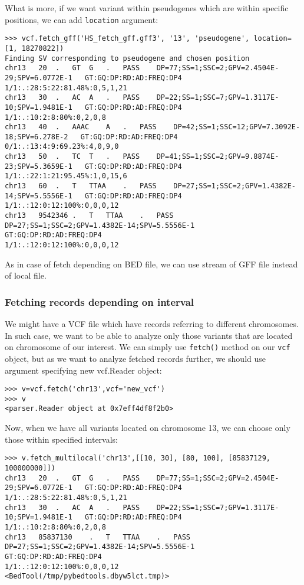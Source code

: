 \noindent What is more, if we want variant within pseudogenes which are within specific positions, we can add
\verb|location| argument:


\begin{verbatim}
>>> vcf.fetch_gff('HS_fetch_gff.gff3', '13', 'pseudogene', location=[1, 18270822])
Finding SV corresponding to pseudogene and chosen position
chr13	20	.	GT	G	.	PASS	DP=77;SS=1;SSC=2;GPV=2.4504E-29;SPV=6.0772E-1	GT:GQ:DP:RD:AD:FREQ:DP4
1/1:.:28:5:22:81.48%:0,5,1,21
chr13	30	.	AC	A	.	PASS	DP=22;SS=1;SSC=7;GPV=1.3117E-10;SPV=1.9481E-1	GT:GQ:DP:RD:AD:FREQ:DP4
1/1:.:10:2:8:80%:0,2,0,8
chr13	40	.	AAAC	A	.	PASS	DP=42;SS=1;SSC=12;GPV=7.3092E-18;SPV=6.278E-2	GT:GQ:DP:RD:AD:FREQ:DP4
0/1:.:13:4:9:69.23%:4,0,9,0
chr13	50	.	TC	T	.	PASS	DP=41;SS=1;SSC=2;GPV=9.8874E-23;SPV=5.3659E-1	GT:GQ:DP:RD:AD:FREQ:DP4
1/1:.:22:1:21:95.45%:1,0,15,6
chr13	60	.	T	TTAA	.	PASS	DP=27;SS=1;SSC=2;GPV=1.4382E-14;SPV=5.5556E-1	GT:GQ:DP:RD:AD:FREQ:DP4
1/1:.:12:0:12:100%:0,0,0,12
chr13	9542346	.	T	TTAA	.	PASS	DP=27;SS=1;SSC=2;GPV=1.4382E-14;SPV=5.5556E-1	GT:GQ:DP:RD:AD:FREQ:DP4
1/1:.:12:0:12:100%:0,0,0,12
\end{verbatim}


\noindent As in case of fetch depending on BED file, we can use stream of GFF file instead of local file.


\subsubsection{Fetching records depending on interval}


\noindent We might have a VCF file which have records referring to different chromosomes. In such case, we want to be able to
analyze only those variants that are located on chromosome of our interest. We can simply use \verb|fetch()| method
on our \verb|vcf| object, but as we want to analyze fetched records further, we should use argument specifying
new vcf.Reader object:


\begin{verbatim}
>>> v=vcf.fetch('chr13',vcf='new_vcf')
>>> v
<parser.Reader object at 0x7eff4df8f2b0>

\end{verbatim}


\noindent Now, when we have all variants located on chromosome 13, we can choose only those within specified intervals:


\begin{verbatim}
>>> v.fetch_multilocal('chr13',[[10, 30], [80, 100], [85837129, 100000000]])
chr13	20	.	GT	G	.	PASS	DP=77;SS=1;SSC=2;GPV=2.4504E-29;SPV=6.0772E-1	GT:GQ:DP:RD:AD:FREQ:DP4
1/1:.:28:5:22:81.48%:0,5,1,21
chr13	30	.	AC	A	.	PASS	DP=22;SS=1;SSC=7;GPV=1.3117E-10;SPV=1.9481E-1	GT:GQ:DP:RD:AD:FREQ:DP4
1/1:.:10:2:8:80%:0,2,0,8
chr13	85837130	.	T	TTAA	.	PASS	DP=27;SS=1;SSC=2;GPV=1.4382E-14;SPV=5.5556E-1	GT:GQ:DP:RD:AD:FREQ:DP4
1/1:.:12:0:12:100%:0,0,0,12
<BedTool(/tmp/pybedtools.dbyw5lct.tmp)>

\end{verbatim}



